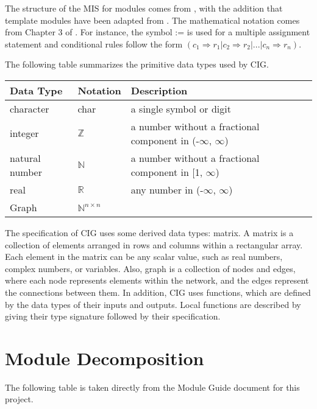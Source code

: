 \documentclass[12pt, titlepage]{article}
\begin{document}
The structure of the MIS for modules comes from \citet{HoffmanAndStrooper1995},
with the addition that template modules have been adapted from
\cite{GhezziEtAl2003}.  The mathematical notation comes from Chapter 3 of
\citet{HoffmanAndStrooper1995}.  For instance, the symbol := is used for a
multiple assignment statement and conditional rules follow the form $(c_1
\Rightarrow r_1 | c_2 \Rightarrow r_2 | ... | c_n \Rightarrow r_n )$.

The following table summarizes the primitive data types used by CIG. 

\begin{center}
\renewcommand{\arraystretch}{1.2}
\noindent 
\begin{tabular}{l l p{7.5cm}} 
\toprule 
\textbf{Data Type} & \textbf{Notation} & \textbf{Description}\\ 
\midrule
character & char & a single symbol or digit\\
integer & $\mathbb{Z}$ & a number without a fractional component in (-$\infty$, $\infty$) \\
natural number & $\mathbb{N}$ & a number without a fractional component in [1, $\infty$) \\
real & $\mathbb{R}$ & any number in (-$\infty$, $\infty$)\\
Graph& ${\mathbb{N}}^ {n\times n}$&\\

\bottomrule
\end{tabular} 
\end{center}

\noindent
The specification of CIG uses some derived data types: matrix. A matrix is a collection of elements arranged in rows and columns within a rectangular array. Each element in the matrix can be any scalar value, such as real numbers, complex numbers, or variables. Also, graph is a collection of nodes and edges, where each node represents elements within the network, and the edges represent the connections between them. In addition, CIG uses functions, which
are defined by the data types of their inputs and outputs. Local functions are
described by giving their type signature followed by their specification.

\section{Module Decomposition}

The following table is taken directly from the Module Guide document for this project.
\end{document}
